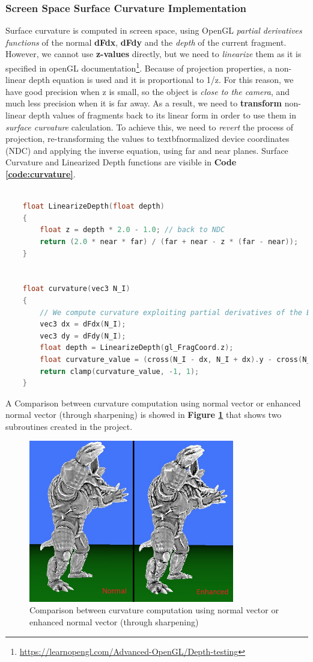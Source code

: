 \subsubsection{Screen Space Surface Curvature Implementation}
Surface curvature is computed in screen space, using OpenGL \textit{partial derivatives functions} of the normal \textbf{dFdx}, \textbf{dFdy} and the \textit{depth} of the current fragment. However, we cannot use \textbf{z-values} directly, but we need to \textit{linearize} them as it is specified in openGL documentation\footnote{\url{https://learnopengl.com/Advanced-OpenGL/Depth-testing}}. \newline
Because of projection properties, a non-linear depth equation is used and it is proportional to 1/z. For this reason, we have good precision when z is small, so the object is \textit{close to the camera}, and much less precision when it is far away. \newline
As a result, we need to \textbf{transform} non-linear depth values of fragments back to its linear form in order to use them in \textit{surface curvature} calculation. To achieve this, we need to \textit{revert} the process of projection, re-transforming the values to textbf{normalized device coordinates (NDC)} and applying the inverse equation, using far and near planes. \newline
Surface Curvature and Linearized Depth functions are visible in \textbf{Code \ref{code:curvature}}.
\begin{lstlisting}[language=C++, caption=Curvature and LinearizeDepth functions in fragment shader,label={code:curvature}]
	
	float LinearizeDepth(float depth) 
	{
		float z = depth * 2.0 - 1.0; // back to NDC 
		return (2.0 * near * far) / (far + near - z * (far - near));	
	}


	float curvature(vec3 N_I)
	{
		// We compute curvature exploiting partial derivatives of the Enhanced Surface Normal
		vec3 dx = dFdx(N_I);
		vec3 dy = dFdy(N_I);
		float depth = LinearizeDepth(gl_FragCoord.z);
		float curvature_value = (cross(N_I - dx, N_I + dx).y - cross(N_I - dy, N_I + dy).x) * 4.0 / depth;
		return clamp(curvature_value, -1, 1);
	}		
\end{lstlisting}
A Comparison between curvature computation using normal vector or enhanced normal vector (through sharpening) is showed in \textbf{Figure \ref{fig:curvature_comparison}} that shows two subroutines created in the project.
\begin{figure}[h]
	\centering
	\includegraphics[width=0.8\textwidth]{Images/curvature_comparison.png}
	\caption{Comparison between curvature computation using normal vector or enhanced normal vector (through sharpening)}
	\label{fig:curvature_comparison}
\end{figure}